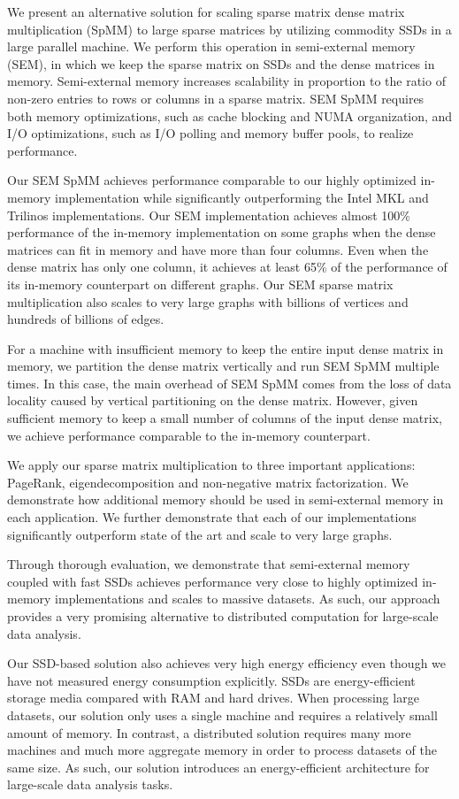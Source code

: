 We present an alternative solution for scaling sparse matrix dense matrix
multiplication (SpMM) to large sparse matrices by utilizing commodity SSDs
in a large parallel machine. We perform this operation in semi-external memory
(SEM), in which
we keep the sparse matrix on SSDs and the dense matrices in memory. Semi-external
memory increases scalability in proportion to the ratio of non-zero entries
to rows or columns in a sparse matrix. SEM SpMM requires both memory optimizations,
such as cache blocking and NUMA organization, and I/O optimizations, such as I/O
polling and memory buffer pools, to realize performance.

Our SEM SpMM achieves performance comparable to our highly optimized in-memory
implementation while significantly outperforming the Intel MKL and
Trilinos implementations. Our SEM implementation achieves almost 100\% performance
of the in-memory implementation on some graphs when the dense matrices can fit
in memory and have more than four columns. Even when the dense matrix has only
one column, it achieves at least 65\% of the performance of its in-memory counterpart
on different graphs. Our SEM sparse matrix multiplication also scales to very
large graphs with billions of vertices and hundreds of billions of edges.

For a machine with insufficient memory to keep the entire input dense matrix
in memory, we partition the dense matrix vertically and run SEM SpMM multiple
times. In this case, the main overhead of SEM SpMM comes from the loss of
data locality caused by vertical partitioning on the dense matrix. However,
given sufficient memory to keep a small number of columns of the input dense
matrix, we achieve performance comparable to the in-memory counterpart.

We apply our sparse matrix multiplication to three important applications:
PageRank, eigendecomposition and non-negative matrix factorization. We demonstrate
how additional memory should be used in semi-external memory in each application.
We further demonstrate that each of our implementations significantly outperform
state of the art and scale to very large graphs.

Through thorough evaluation, we demonstrate that semi-external memory
coupled with fast SSDs achieves performance very close to highly optimized
in-memory implementations and scales to massive datasets.
As such, our approach provides a very promising alternative to distributed
computation for large-scale data analysis.

Our SSD-based solution also achieves very high energy efficiency even though
we have not measured energy consumption explicitly. SSDs are energy-efficient
storage media \cite{Tsirogiannis} compared with RAM and hard drives.
When processing large datasets, our solution only uses
a single machine and requires a relatively small amount of memory. In contrast,
a distributed solution requires many more machines and much more aggregate
memory in order to process datasets of the same size. As such, our solution
introduces an energy-efficient architecture for large-scale data analysis tasks.
